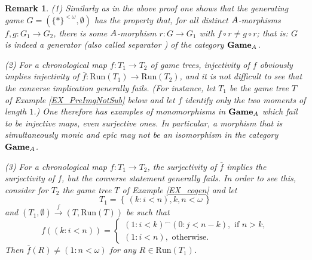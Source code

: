 \documentclass[12pt]{amsart}
\newtheorem{remark}[thm]{Remark}
\theoremstyle{definition}
\newcommand{\set}[1]{\left\{\, {#1} \,\right\}}
\newcommand{\seq}[1]{{\left( {#1} \right)}}
\newcommand{\A}{\textup{\textmd{\textsc{A}}}}
\newcommand{\Run}{{\mathrm{Run}}}
\newcommand{\Games}{\mathbf{Game}}
\begin{document}
\begin{remark}\label{REM_generator} 
	{\em(1)} Similarly as in the above proof one shows that the generating game $G=(\{*\}^{<\omega},\emptyset)$ has the property that, for all distinct $\A$-morphisms $f,g:G_1\to G_2$, there is some $\A$-morphism $r:G\to G_1$ with $f\circ r\neq g\circ r$; that is: $G$ is indeed a {\em generator} (also called {\em separator} \cite{Adamek1990}) of the category $\Games_{\A}$.
	
	{\em(2)} For a chronological map $f:T_1\to T_2$ of game trees, injectivity of $f$ obviously implies injectivity of $\overline{f}:\mathrm{Run}(T_1)\to\mathrm{Run}(T_2)$, and it is not difficult to see that the converse implication generally fails. (For instance, let $T_1$ be the game tree $T$ of {\em Example \ref{EX_PreImgNotSub}} below and let $f$ identify only the two moments  
	of length $1$.)  One therefore has examples of monomorphisms in $\Games_{\A}$ which fail to be injective maps, even surjective ones. In particular, a morphism that is simultaneously monic and epic may not be an isomorphism in the category $\Games_{\A}$.
	
	{\em(3)} For a chronological map $f:T_1\to T_2$, the surjectivity of $\overline{f}$ implies the surjectivity of $f$, but the converse statement generally fails. In order to see this, consider for $T_2$ the game tree $T$ of {\rm Example \ref{EX_cogen}} and let
	\[
	T_1=\set{\seq{k:i<n}, k,n<\omega}
	\]
	and $(T_1,\emptyset)\stackrel{f}{\to} (T,\mathrm{Run}(T))$ be such that
	\[
	f(\seq{k:i<n}) = \begin{cases}
		\seq{1:i<k}^\smallfrown \seq{0:j<n-k}, \text{ if $n>k$},\\
		\seq{1:i<n}, \text{ otherwise.}
	\end{cases}
	\]
	Then $\overline{f}(R)\neq\seq{1:n<\omega}$ for any $R\in \Run(T_1)$.
	

\end{remark}
\end{document}
